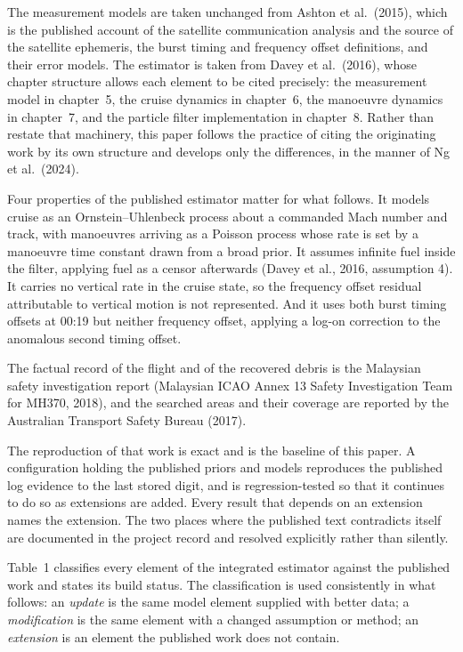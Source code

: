 \documentclass[12pt,a4paper]{article}
\begin{document}
The measurement models are taken unchanged from Ashton et al.\ (2015), which is the published
account of the satellite communication analysis and the source of the satellite ephemeris, the
burst timing and frequency offset definitions, and their error models. The estimator is taken
from Davey et al.\ (2016), whose chapter structure allows each element to be cited precisely:
the measurement model in chapter~5, the cruise dynamics in chapter~6, the manoeuvre dynamics in
chapter~7, and the particle filter implementation in chapter~8. Rather than restate that
machinery, this paper follows the practice of citing the originating work by its own structure
and develops only the differences, in the manner of Ng et al.\ (2024).

Four properties of the published estimator matter for what follows. It models cruise as an
Ornstein--Uhlenbeck process about a commanded Mach number and track, with manoeuvres arriving
as a Poisson process whose rate is set by a manoeuvre time constant drawn from a broad prior.
It assumes infinite fuel inside the filter, applying fuel as a censor afterwards
(Davey et al., 2016, assumption 4). It carries no vertical rate in the cruise state, so the
frequency offset residual attributable to vertical motion is not represented. And it uses both
burst timing offsets at 00:19 but neither frequency offset, applying a log-on correction to the
anomalous second timing offset.

The factual record of the flight and of the recovered debris is the Malaysian safety
investigation report (Malaysian ICAO Annex 13 Safety Investigation Team for MH370, 2018), and
the searched areas and their coverage are reported by the Australian Transport Safety Bureau
(2017).

The reproduction of that work is exact and is the baseline of this paper. A configuration
holding the published priors and models reproduces the published log evidence to the last
stored digit, and is regression-tested so that it continues to do so as extensions are added.
Every result that depends on an extension names the extension. The two places where the
published text contradicts itself are documented in the project record and resolved
explicitly rather than silently.

Table~1 classifies every element of the integrated estimator against the published work and
states its build status. The classification is used consistently in what follows: an
\emph{update} is the same model element supplied with better data; a \emph{modification} is the
same element with a changed assumption or method; an \emph{extension} is an element the
published work does not contain.
\end{document}
